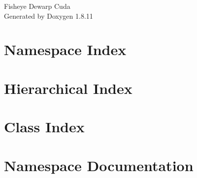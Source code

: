 \documentclass[twoside]{book}
\newcommand{\+}{\discretionary{\mbox{\scriptsize$\hookleftarrow$}}{}{}}
\newcommand{\clearemptydoublepage}{%
  \newpage{\pagestyle{empty}\cleardoublepage}%
}
\begin{document}
\hypersetup{pageanchor=false,
             bookmarksnumbered=true,
             pdfencoding=unicode
            }
\begin{titlepage}
\vspace*{7cm}
\begin{center}%
{\Large Fisheye Dewarp Cuda }\\
\vspace*{1cm}
{\large Generated by Doxygen 1.8.11}\\
\end{center}
\end{titlepage}
\clearemptydoublepage
\tableofcontents
\clearemptydoublepage
{}
\hypersetup{pageanchor=true}

\chapter{Namespace Index}

\chapter{Hierarchical Index}

\chapter{Class Index}

\chapter{Namespace Documentation}

\end{document}
